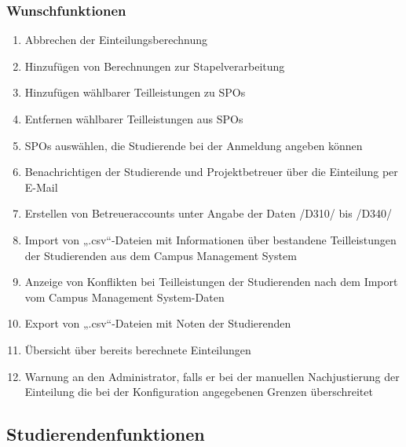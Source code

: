 \documentclass[parskip=full]{scrartcl}
\newcommand{\swtLabel}[1]{\textbf{/#1\arabic*0/}}
\begin{document}
\subsubsection{Wunschfunktionen}
\begin{enumerate}[label=\swtLabel{FA}, resume]
  \item Abbrechen der Einteilungsberechnung
  \item Hinzufügen von Berechnungen zur Stapelverarbeitung
  \item Hinzufügen wählbarer Teilleistungen zu SPOs
  \item Entfernen wählbarer Teilleistungen aus SPOs
  \item SPOs auswählen, die Studierende bei der Anmeldung angeben können 
\item 
Benachrichtigen der Studierende und Projektbetreuer über die Einteilung
per E-Mail
\item Erstellen von Betreueraccounts unter Angabe der Daten /D310/ bis /D340/
\item Import von „.csv“-Dateien mit Informationen über bestandene Teilleistungen
der Studierenden aus dem Campus Management System
\item Anzeige von Konflikten bei Teilleistungen der Studierenden nach dem Import
vom Campus Management System-Daten
\item Export von „.csv“-Dateien mit Noten der Studierenden
\item Übersicht über bereits berechnete Einteilungen
\item Warnung an den Administrator, falls er bei der manuellen Nachjustierung
der Einteilung die bei der Konfiguration angegebenen Grenzen überschreitet
\end{enumerate}


\subsection{Studierendenfunktionen}
\end{document}
